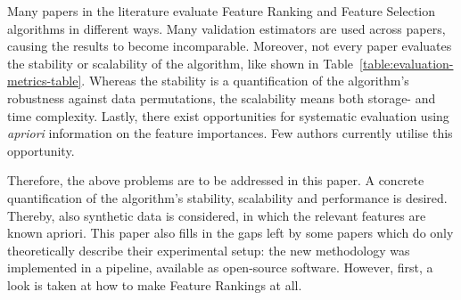 \documentclass[../main.tex]{subfiles}
\begin{document}
Many papers in the literature evaluate Feature Ranking and Feature Selection algorithms in different ways. Many validation estimators are used across papers, causing the results to become incomparable. Moreover, not every paper evaluates the stability or scalability of the algorithm, like shown in Table~\ref{table:evaluation-metrics-table}. Whereas the stability is a quantification of the algorithm's robustness against data permutations, the scalability means both storage- and time complexity. Lastly, there exist opportunities for systematic evaluation using \textit{\gls{apriori}} information on the feature importances. Few authors currently utilise this opportunity.

Therefore, the above problems are to be addressed in this paper. A concrete quantification of the algorithm's stability, scalability and performance is desired. Thereby, also synthetic data is considered, in which the relevant features are known \gls{apriori}. This paper also fills in the gaps left by some papers which do only theoretically describe their experimental setup: the new methodology was implemented in a pipeline, available as open-source software. However, first, a look is taken at how to make Feature Rankings at all.


\biblio
\end{document}
